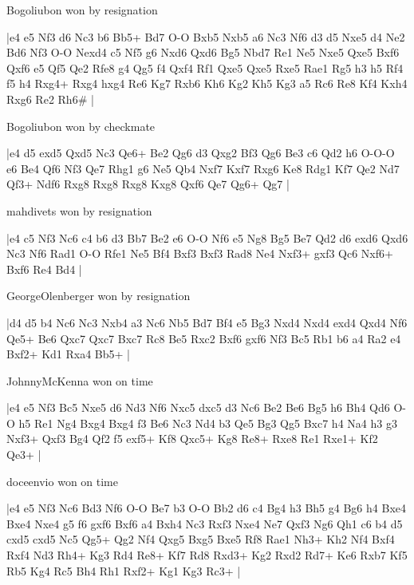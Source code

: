 \showboard

Bogoliubon won by resignation

\makegametitle
|e4 e5 Nf3 d6 Nc3 b6 Bb5+ Bd7 O-O Bxb5 Nxb5 a6 Nc3 Nf6 d3 d5 Nxe5 d4 Ne2 Bd6 Nf3 O-O Nexd4 c5 Nf5 g6 Nxd6 Qxd6 Bg5 Nbd7 Re1 Ne5 Nxe5 Qxe5 Bxf6 Qxf6 e5 Qf5 Qe2 Rfe8 g4 Qg5 f4 Qxf4 Rf1 Qxe5 Qxe5 Rxe5 Rae1 Rg5 h3 h5 Rf4 f5 h4 Rxg4+ Rxg4 hxg4 Re6 Kg7 Rxb6 Kh6 Kg2 Kh5 Kg3 a5 Rc6 Re8 Kf4 Kxh4 Rxg6 Re2 Rh6\#  |

\showboard

Bogoliubon won by checkmate

\makegametitle
|e4 d5 exd5 Qxd5 Nc3 Qe6+ Be2 Qg6 d3 Qxg2 Bf3 Qg6 Be3 c6 Qd2 h6 O-O-O e6 Be4 Qf6 Nf3 Qe7 Rhg1 g6 Ne5 Qb4 Nxf7 Kxf7 Rxg6 Ke8 Rdg1 Kf7 Qe2 Nd7 Qf3+ Ndf6 Rxg8 Rxg8 Rxg8 Kxg8 Qxf6 Qe7 Qg6+ Qg7  |

\showboard

mahdivets won by resignation

\makegametitle
|e4 c5 Nf3 Nc6 c4 b6 d3 Bb7 Be2 e6 O-O Nf6 e5 Ng8 Bg5 Be7 Qd2 d6 exd6 Qxd6 Nc3 Nf6 Rad1 O-O Rfe1 Ne5 Bf4 Bxf3 Bxf3 Rad8 Ne4 Nxf3+ gxf3 Qc6 Nxf6+ Bxf6 Re4 Bd4  |

\showboard

GeorgeOlenberger won by resignation

\makegametitle
|d4 d5 b4 Nc6 Nc3 Nxb4 a3 Nc6 Nb5 Bd7 Bf4 e5 Bg3 Nxd4 Nxd4 exd4 Qxd4 Nf6 Qe5+ Be6 Qxc7 Qxc7 Bxc7 Rc8 Be5 Rxc2 Bxf6 gxf6 Nf3 Bc5 Rb1 b6 a4 Ra2 e4 Bxf2+ Kd1 Rxa4 Bb5+  |

\showboard

JohnnyMcKenna won on time

\makegametitle
|e4 e5 Nf3 Bc5 Nxe5 d6 Nd3 Nf6 Nxc5 dxc5 d3 Nc6 Be2 Be6 Bg5 h6 Bh4 Qd6 O-O h5 Re1 Ng4 Bxg4 Bxg4 f3 Be6 Nc3 Nd4 b3 Qe5 Bg3 Qg5 Bxc7 h4 Na4 h3 g3 Nxf3+ Qxf3 Bg4 Qf2 f5 exf5+ Kf8 Qxc5+ Kg8 Re8+ Rxe8 Re1 Rxe1+ Kf2 Qe3+  |

\showboard

doceenvio won on time

\makegametitle
|e4 e5 Nf3 Nc6 Bd3 Nf6 O-O Be7 b3 O-O Bb2 d6 c4 Bg4 h3 Bh5 g4 Bg6 h4 Bxe4 Bxe4 Nxe4 g5 f6 gxf6 Bxf6 a4 Bxh4 Nc3 Rxf3 Nxe4 Ne7 Qxf3 Ng6 Qh1 c6 b4 d5 cxd5 cxd5 Nc5 Qg5+ Qg2 Nf4 Qxg5 Bxg5 Bxe5 Rf8 Rae1 Nh3+ Kh2 Nf4 Bxf4 Rxf4 Nd3 Rh4+ Kg3 Rd4 Re8+ Kf7 Rd8 Rxd3+ Kg2 Rxd2 Rd7+ Ke6 Rxb7 Kf5 Rb5 Kg4 Rc5 Bh4 Rh1 Rxf2+ Kg1 Kg3 Rc3+  |

